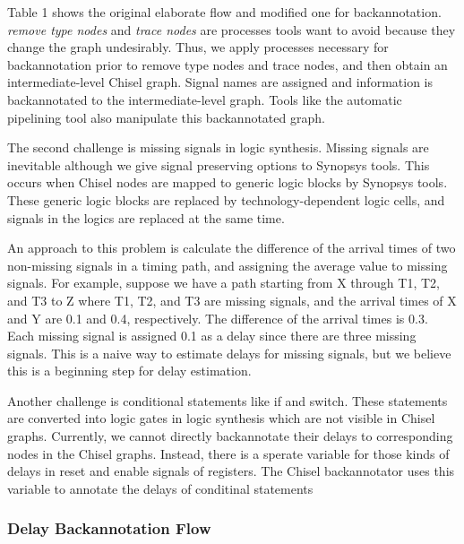 Table 1 shows the original elaborate flow and modified one for backannotation. \emph{remove type nodes} and \emph{trace nodes} are processes tools want to avoid because they change the graph undesirably. Thus, we apply processes necessary for backannotation prior to remove type nodes and trace nodes, and then obtain an intermediate-level Chisel graph. Signal names are assigned and information is backannotated to the intermediate-level graph. Tools like the automatic pipelining tool also manipulate this backannotated graph.

The second challenge is missing signals in logic synthesis. Missing signals are inevitable although we give signal preserving options to Synopsys tools. This occurs when Chisel nodes are mapped to generic logic blocks by Synopsys tools. These generic logic blocks are replaced by technology-dependent logic cells, and signals in the logics are replaced at the same time.

An approach to this problem is calculate the difference of the arrival times of two non-missing signals in a timing path, and assigning the average value to missing signals. For example, suppose we have a path starting from X through T1, T2, and T3 to Z where T1, T2, and T3 are missing signals, and the arrival times of X and Y are 0.1 and 0.4, respectively. The difference of the arrival times is 0.3.  Each missing signal is assigned 0.1 as a delay since there are three missing signals. This is a naive way to estimate delays for missing signals, but we believe this is a beginning step for delay estimation.

Another challenge is conditional statements like if and switch. These statements are converted into logic gates in logic synthesis which are not visible in Chisel graphs. Currently, we cannot directly backannotate their delays to corresponding nodes in the Chisel graphs. Instead, there is a sperate variable for those kinds of delays in reset and enable signals of registers. The Chisel backannotator uses this variable to annotate the delays of conditinal statements

\subsubsection{Delay Backannotation Flow}
